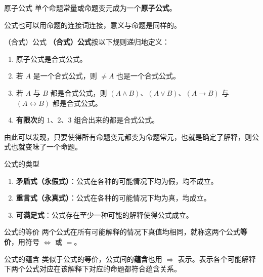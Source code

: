 
\begin{definition}{原子公式}
单个命题常量或命题变元成为一个\textbf{原子公式}。
\end{definition}

公式也可以用命题的连接词连接，意义与命题是同样的。


\begin{definition}{（合式）公式}
\textbf{（合式）公式}按以下规则递归地定义：
\begin{enumerate}
\item 原子公式是合式公式。
\item 若 $A$ 是一个合式公式，则 $\neq A$ 也是一个合式公式。
\item 若 $A$ 与 $B$ 都是合式公式，则 $(A \land B)$、$(A \lor B)$、$(A \to B)$ 与 $(A \leftrightarrow B)$ 都是合式公式。
\item \textbf{有限次}的 $1$、$2$、$3$ 组合出来的都是合式公式。
\end{enumerate}
由此可以发现，只要使得所有命题变元都变为命题常元，也就是确定了解释，则公式也就变味了一个命题。

\end{definition}
\begin{definition}{公式的类型}
\begin{enumerate}
\item \textbf{矛盾式（永假式）}：公式在各种的可能情况下均为假，均不成立。
\item \textbf{重言式（永真式）}：公式在各种的可能情况下均为真，均成立。
\item \textbf{可满足式}：公式存在至少一种可能的解释使得公式成立。
\end{enumerate}
\end{definition}

\begin{definition}{公式的等价}
两个公式在所有可能解释的情况下真值均相同，就称这两个公式\textbf{等价}，用符号 $\Leftrightarrow$ 或 $=$。
\end{definition}

\begin{definition}{公式的蕴含}
类似于公式的等价，公式间的\textbf{蕴含}也用 $\Rightarrow$ 表示。表示各个可能解释下两个公式对应在该解释下对应的命题都符合蕴含关系。
\end{definition}